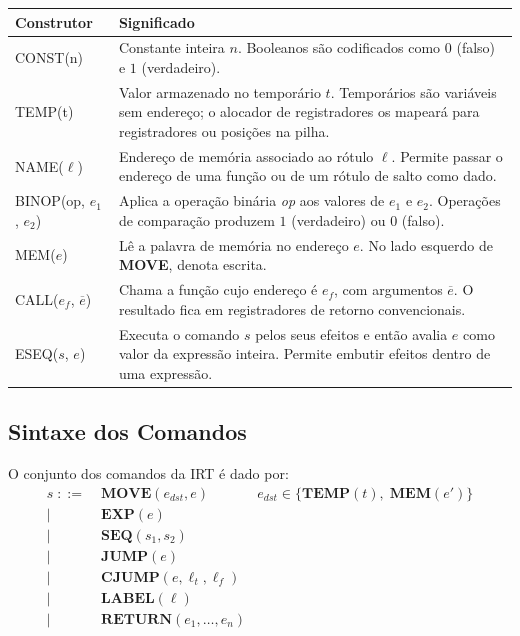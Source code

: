 \begin{center}
  \renewcommand{\arraystretch}{1.3}
  \begin{tabular}{>{\ttfamily}l p{9.5cm}}
    \toprule
    \normalfont Construtor & Significado \\
    \midrule
    CONST(n)            & Constante inteira $n$.  Booleanos são codificados como
    $0$ (falso) e $1$ (verdadeiro). \\
    TEMP(t)             & Valor armazenado no temporário $t$.  Temporários são
    variáveis sem endereço; o alocador de registradores os
    mapeará para registradores ou posições na pilha. \\
    NAME($\ell$)        & Endereço de memória associado ao rótulo
    $\ell$.  Permite
    passar o endereço de uma função ou de um rótulo de salto
    como dado. \\
    BINOP(op, $e_1$, $e_2$) & Aplica a operação binária \textit{op}
    aos valores de
    $e_1$ e $e_2$.  Operações de comparação produzem $1$
    (verdadeiro) ou $0$ (falso). \\
    MEM($e$)            & Lê a palavra de memória no endereço $e$.  No lado
    esquerdo de \textbf{MOVE}, denota escrita. \\
    CALL($e_f$, $\overline{e}$) & Chama a função cujo endereço é $e_f$, com
    argumentos $\overline{e}$.  O resultado fica em
    registradores de retorno convencionais. \\
    ESEQ($s$, $e$)      & Executa o comando $s$ pelos seus efeitos e
    então avalia
    $e$ como valor da expressão inteira.  Permite embutir
    efeitos dentro de uma expressão. \\
    \bottomrule
  \end{tabular}
\end{center}

\subsection{Sintaxe dos Comandos}\label{sec:irt-stmt}

\begin{Definition}\label{def:irt-stmt}
  O conjunto dos comandos da IRT é dado por:
  \begin{align*}
    s \;::=\; & \mathbf{MOVE}(e_{\mathit{dst}}, e)
    & e_{\mathit{dst}} \in \{\mathbf{TEMP}(t),\; \mathbf{MEM}(e')\} \\
    \mid\; & \mathbf{EXP}(e) \\
    \mid\; & \mathbf{SEQ}(s_1, s_2) \\
    \mid\; & \mathbf{JUMP}(e) \\
    \mid\; & \mathbf{CJUMP}(e, \ell_t, \ell_f) \\
    \mid\; & \mathbf{LABEL}(\ell) \\
    \mid\; & \mathbf{RETURN}(e_1, \ldots, e_n)
  \end{align*}
\end{Definition}

